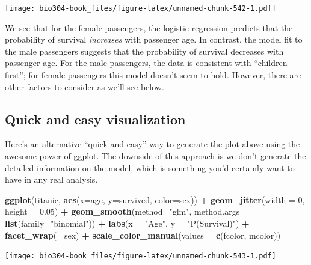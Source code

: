 \documentclass[]{book}
\newenvironment{Shaded}{\begin{snugshade}}{\end{snugshade}}
\newcommand{\DataTypeTok}[1]{\textcolor[rgb]{0.13,0.29,0.53}{#1}}
\newcommand{\DecValTok}[1]{\textcolor[rgb]{0.00,0.00,0.81}{#1}}
\newcommand{\FloatTok}[1]{\textcolor[rgb]{0.00,0.00,0.81}{#1}}
\newcommand{\KeywordTok}[1]{\textcolor[rgb]{0.13,0.29,0.53}{\textbf{#1}}}
\newcommand{\NormalTok}[1]{#1}
\newcommand{\OperatorTok}[1]{\textcolor[rgb]{0.81,0.36,0.00}{\textbf{#1}}}
\newcommand{\StringTok}[1]{\textcolor[rgb]{0.31,0.60,0.02}{#1}}
\theoremstyle{definition}
\theoremstyle{definition}
\theoremstyle{definition}
\theoremstyle{remark}
\begin{document}
\texttt{[image: bio304-book\_files/figure-latex/unnamed-chunk-542-1.pdf]}

We see that for the female passengers, the logistic regression predicts
that the probability of survival \emph{increases} with passenger age. In
contrast, the model fit to the male passengers suggests that the
probability of survival decreases with passenger age. For the male
passengers, the data is consistent with ``children first''; for female
passengers this model doesn't seem to hold. However, there are other
factors to consider as we'll see below.

\hypertarget{quick-and-easy-visualization}{%
\subsection{Quick and easy
visualization}\label{quick-and-easy-visualization}}

Here's an alternative ``quick and easy'' way to generate the plot above
using the awesome power of ggplot. The downside of this approach is we
don't generate the detailed information on the model, which is something
you'd certainly want to have in any real analysis.

\begin{Shaded}
\begin{Highlighting}[]
\KeywordTok{ggplot}\NormalTok{(titanic, }\KeywordTok{aes}\NormalTok{(}\DataTypeTok{x=}\NormalTok{age, }\DataTypeTok{y=}\NormalTok{survived, }\DataTypeTok{color=}\NormalTok{sex)) }\OperatorTok{+}\StringTok{ }
\StringTok{  }\KeywordTok{geom_jitter}\NormalTok{(}\DataTypeTok{width =} \DecValTok{0}\NormalTok{, }\DataTypeTok{height =} \FloatTok{0.05}\NormalTok{) }\OperatorTok{+}
\StringTok{  }\KeywordTok{geom_smooth}\NormalTok{(}\DataTypeTok{method=}\StringTok{"glm"}\NormalTok{,  }\DataTypeTok{method.args =} \KeywordTok{list}\NormalTok{(}\DataTypeTok{family=}\StringTok{"binomial"}\NormalTok{))  }\OperatorTok{+}\StringTok{ }
\StringTok{  }\KeywordTok{labs}\NormalTok{(}\DataTypeTok{x =} \StringTok{"Age"}\NormalTok{, }\DataTypeTok{y =} \StringTok{"P(Survival)"}\NormalTok{) }\OperatorTok{+}
\StringTok{  }\KeywordTok{facet_wrap}\NormalTok{(}\OperatorTok{~}\StringTok{ }\NormalTok{sex) }\OperatorTok{+}
\StringTok{  }\KeywordTok{scale_color_manual}\NormalTok{(}\DataTypeTok{values =} \KeywordTok{c}\NormalTok{(fcolor, mcolor))}
\end{Highlighting}
\end{Shaded}

\texttt{[image: bio304-book\_files/figure-latex/unnamed-chunk-543-1.pdf]}
\end{document}
